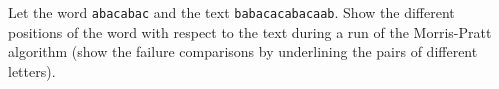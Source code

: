 Let the word \texttt{abacabac} and the text
\texttt{babacacabacaab}. Show the different positions of the word with
respect to the text during a run of the Morris\hyp{}Pratt algorithm
(show the failure comparisons by underlining the pairs of different
letters).
